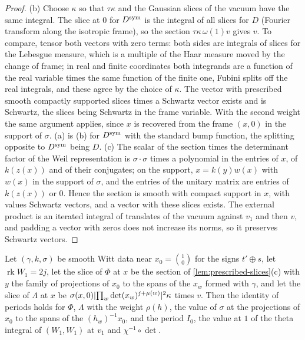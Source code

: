 \begin{proof}
(b) Choose $\kappa$ so that $\tau\kappa$ and the Gaussian slices of the vacuum have the same integral. The slice at $0$ for $D^{\rm sym}$ is the integral of all slices for $D$ (Fourier transform along the isotropic
frame), so the section $\tau\kappa\,\omega(1)v$ gives $v$. To compare, tensor both vectors with zero terms: both sides are integrals of slices for the Lebesgue measure, which is a multiple of the Haar measure moved
by the change of frame; in real and finite coordinates both integrands are a function of the real variable times the same function of the finite one, Fubini splits off the real integrals, and these agree by the
choice of $\kappa$. The vector with prescribed smooth compactly supported slices times a Schwartz vector exists and is Schwartz, the slices being Schwartz in the frame variable. With the second weight the
same argument applies, since $x$ is recovered from the frame $(x,0)$ in the support of $\sigma$. (a) is (b) for $D^{\rm sym}$ with the standard bump function, the splitting opposite to $D^{\rm sym}$ being $D$.
(c) The scalar of the section times the determinant factor of the Weil representation is $\sigma\cdot\sigma$ times a polynomial in the entries of $x$, of $k(z(x))$ and of their conjugates; on the support,
$x=k(y)w(x)$ with $w(x)$ in the support of $\sigma$, and the entries of the unitary matrix are entries of $k(z(x))$ or $0$. Hence the section is smooth with compact support in $x$, with values Schwartz vectors, and a
vector with these slices exists. The external product is an iterated integral of translates of the vacuum against $v_1$ and then $v$, and padding a vector with zeros does not increase its norms, so it preserves
Schwartz vectors.
\end{proof}

\begin{lemma}\label{lem:witt-periods}
Let $(\gamma,k,\sigma)$ be smooth Witt data near $x_0=\binom10$ for the signs $t'\oplus s$, let $\operatorname{rk}W_1=2j$, let the slice of $\Phi$ at $x$ be the section of \cref{lem:prescribed-slices}(c) with
$y$ the family of projections of $x_0$ to the spans of the $x_w$ formed with $\gamma$, and let the slice of $\Lambda$ at $x$ be $\sigma(x,0)\lvert \prod_w\det(x_w)^{j+\mu(w)}\rvert^2\kappa$ times $v$. Then the identity of
periods holds for $\Phi$, $\Lambda$ with the weight $\rho(h)$, the value of $\sigma$ at the projections of $x_0$ to the spans of the $(h_w)^{-1}x_0$, and the period $I_0$, the value at $1$ of the theta integral
of $(W_1,W_1)$ at $v_1$ and $\chi^{-1}\circ\det$.
\end{lemma}

